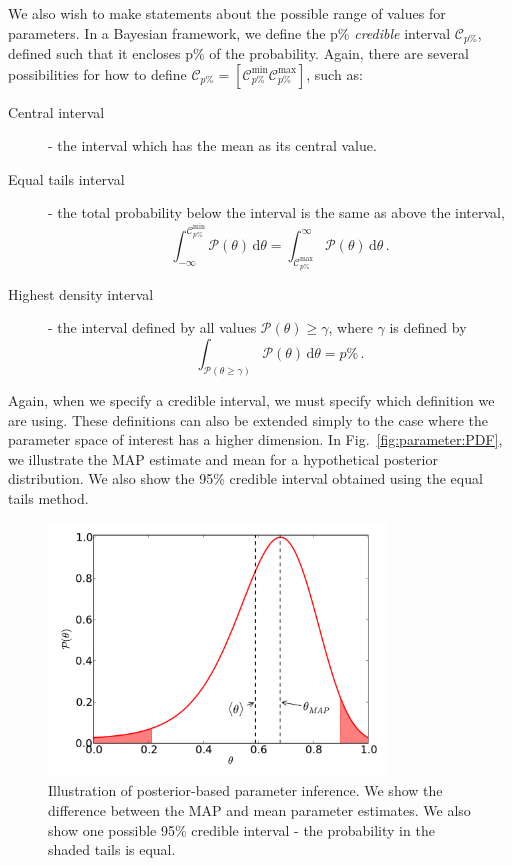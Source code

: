 We also wish to make statements about the possible range of values for parameters. In a Bayesian framework, we define the p\% \textit{credible} interval $\mathcal{C}_{p\%}$, defined such that it encloses p\% of the probability. Again, there are several possibilities for how to define $\mathcal{C}_{p\%} = [\mathcal{C}_{p\%}^\textrm{min} \mathcal{C}_{p\%}^\textrm{max}]$, such as:
\begin{description}
\item[Central interval] - the interval which has the mean as its central value.
\item[Equal tails interval] - the total probability below the interval is the same as above the interval,
\begin{equation}
\int_{-\infty}^{\mathcal{C}_{p\%}^\textrm{min}} \mathcal{P}(\theta) \, \mathrm{d}\theta = \int_{\mathcal{C}_{p\%}^\textrm{max}}^{\infty} \mathcal{P}(\theta) \, \mathrm{d}\theta\,.
\end{equation}
\item[Highest density interval] - the interval defined by all values $\mathcal{P}(\theta) \geq \gamma$, where $\gamma$ is defined by
\begin{equation}
\int_{\mathcal{P}(\theta \geq \gamma)} \mathcal{P}(\theta) \, \mathrm{d}\theta = p\%\,.
\end{equation}
\end{description}
Again, when we specify a credible interval, we must specify which definition we are using. These definitions can also be extended simply to the case where the parameter space of interest has a higher dimension. In Fig.~\ref{fig:parameter:PDF}, we illustrate the MAP estimate and mean for a hypothetical posterior distribution. We also show the 95\% credible interval obtained using the equal tails method.

\begin{figure}[t]
\centering
  \includegraphics[width=0.8\textwidth]{ParamRecon/PDF.pdf}
  \caption[Posterior-based parameter inference]{Illustration of posterior-based parameter inference. We show the difference between the MAP and mean parameter estimates. We also show one possible 95\% credible interval - the probability in the shaded tails is equal.}
  \label{fig:parameter:likelihood}
\end{figure}


